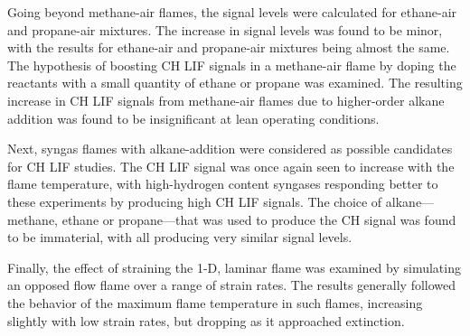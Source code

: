 Going beyond methane-air flames, the signal levels were calculated for ethane-air and propane-air mixtures.
The increase in signal levels was found to be minor, with the results for ethane-air and propane-air mixtures being almost the same.
The hypothesis of boosting CH LIF signals in a methane-air flame by doping the reactants with a small quantity of ethane or propane was examined.
The resulting increase in CH LIF signals from methane-air flames due to higher-order alkane addition was found to be insignificant at lean operating conditions.

Next, syngas flames with alkane-addition were considered as possible candidates for CH LIF studies.
The CH LIF signal was once again seen to increase with the flame temperature, with high-hydrogen content syngases responding better to these experiments by producing high CH LIF signals.
The choice of alkane---methane, ethane or propane---that was used to produce the CH signal was found to be immaterial, with all producing very similar signal levels.

Finally, the effect of straining the 1-D, laminar flame was examined by simulating an opposed flow flame over a range of strain rates.
The results generally followed the behavior of the maximum flame temperature in such flames, increasing slightly with low strain rates, but dropping as it approached extinction.

